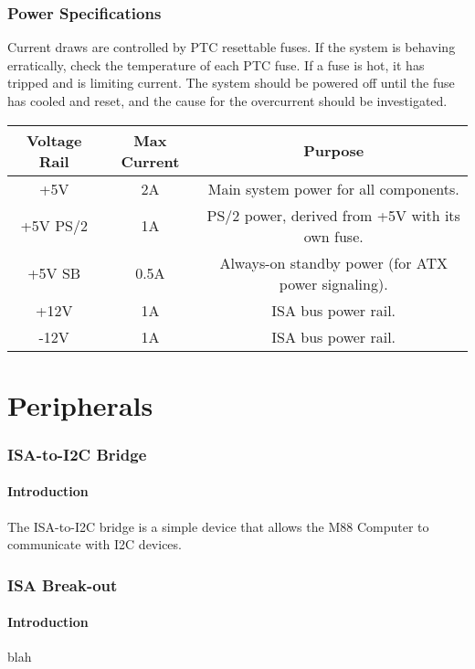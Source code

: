 \documentclass[twoside,10pt,letterpaper]{refart}
\begin{document}
\section{Power Specifications}

Current draws are controlled by PTC resettable fuses. If the system is behaving erratically,
check the temperature of each PTC fuse. If a fuse is hot, it has tripped and is limiting current.
The system should be powered off until the fuse has cooled and reset, and the cause for the overcurrent
should be investigated.

\begin{center}
\begin{tabular}{ c|c|c  }
 \hline
 \textbf{Voltage Rail}   & \textbf{Max Current}    & \textbf{Purpose} \\
 \hline
 +5V & 2A & Main system power for all components. \\
 +5V PS/2 & 1A & PS/2 power, derived from +5V with its own fuse. \\
 +5V SB & 0.5A & Always-on standby power (for ATX power signaling). \\
 +12V & 1A & ISA bus power rail. \\
 -12V & 1A & ISA bus power rail. \\
\end{tabular}
\end{center}

\newpage

\part{Peripherals}

\section{ISA-to-I2C Bridge}

\subsection{Introduction}
The ISA-to-I2C bridge is a simple device that allows the {\codefamily M88} Computer to communicate
with I2C devices.

\newpage

\section{ISA Break-out}

\subsection{Introduction}
blah
\end{document}
